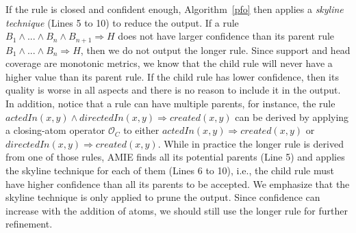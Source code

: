 If the rule is closed and confident enough, Algorithm~\ref{pfo} then applies a \emph{skyline technique} (Lines 5 to 10)
to reduce the output. If a rule $B_1 \wedge ... \wedge B_n \wedge B_{n+1} \Rightarrow H$ does not have larger confidence
than its parent rule $B_1 \wedge ... \wedge B_n \Rightarrow H$, then we do not output the longer rule.
Since support and head coverage are monotonic metrics, we know that the child rule will never have a higher value than its parent rule. 
If the child rule has lower confidence, then its quality is worse in all aspects and there is 
no reason to include it in the output.
In addition, notice that a rule can have multiple parents, for instance, the rule $actedIn(x,y) \wedge directedIn(x,y) \Rightarrow created(x,y)$
can be derived by applying a closing-atom operator $\mathcal{O}_C$ to either $actedIn(x,y) \Rightarrow created(x,y)$ or
$directedIn(x,y) \Rightarrow created(x,y)$. While in practice the longer rule is derived from one of those rules, AMIE
finds all its potential parents (Line 5) and applies the skyline technique for each of them (Lines 6 to 10), i.e., the child
rule must have higher confidence than all its parents to be accepted.
We emphasize that the skyline technique is only applied to prune the output. 
Since confidence can increase with the addition of atoms, we should still use the longer rule 
for further refinement.

% 



